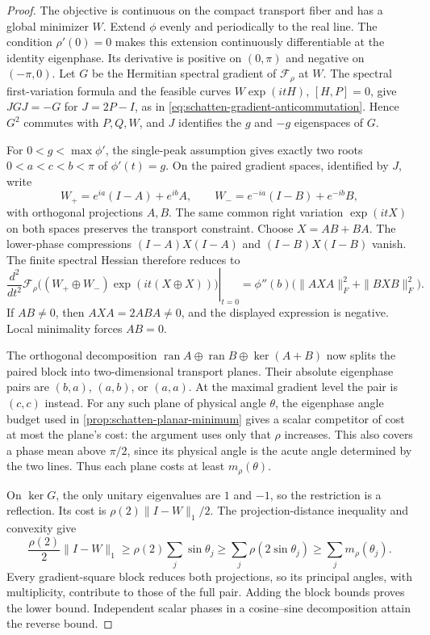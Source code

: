 \begin{proof}
The objective is continuous on the compact transport fiber and has a
global minimizer $W$. Extend $\phi$ evenly and periodically to the
real line. The condition $\rho'(0)=0$ makes this extension continuously
differentiable at the identity eigenphase. Its derivative is positive on
$(0,\pi)$ and negative on $(-\pi,0)$. Let $G$ be the Hermitian spectral
gradient of $\mathcal F_\rho$ at $W$. The spectral first-variation
formula and the feasible curves $W\exp(itH)$, $[H,P]=0$, give
$JGJ=-G$ for $J=2P-I$, as in
\cref{eq:schatten-gradient-anticommutation}. Hence $G^2$ commutes with
$P,Q,W$, and $J$ identifies the $g$ and $-g$ eigenspaces of $G$.

For $0<g<\max\phi'$, the single-peak assumption gives exactly two
roots $0<a<c<b<\pi$ of $\phi'(t)=g$. On the paired gradient spaces,
identified by $J$, write
\[
 W_+=e^{ia}(I-A)+e^{ib}A,\qquad
 W_-=e^{-ia}(I-B)+e^{-ib}B,
\]
with orthogonal projections $A,B$. The same common right variation
$\exp(itX)$ on both spaces preserves the transport constraint. Choose
$X=AB+BA$. The lower-phase compressions
$(I-A)X(I-A)$ and $(I-B)X(I-B)$ vanish. The finite spectral Hessian
therefore reduces to
\[
 \left.\frac{d^2}{dt^2}\mathcal F_\rho
      \bigl((W_+\oplus W_-)\exp(it(X\oplus X))\bigr)\right|_{t=0}
 =\phi''(b)\bigl(\|AXA\|_F^2+\|BXB\|_F^2\bigr).
\]
If $AB\ne0$, then $AXA=2ABA\ne0$, and the displayed expression is
negative. Local minimality forces $AB=0$.

The orthogonal decomposition
$\operatorname{ran}A\oplus\operatorname{ran}B\oplus\ker(A+B)$ now
splits the paired block into two-dimensional transport planes. Their
absolute eigenphase pairs are $(b,a)$, $(a,b)$, or $(a,a)$.
At the maximal gradient level the pair is $(c,c)$ instead.
For any such plane of physical angle $\theta$, the eigenphase angle
budget used in \cref{prop:schatten-planar-minimum} gives a scalar
competitor of cost at most the plane's cost: the argument uses only
that $\rho$ increases. This also covers a phase mean above $\pi/2$,
since its physical angle is the acute angle determined by the two lines.
Thus each plane costs at least $m_\rho(\theta)$.

On $\ker G$, the only unitary eigenvalues are $1$ and $-1$, so the
restriction is a reflection. Its cost is
$\rho(2)\|I-W\|_1/2$. The projection-distance inequality and convexity
give
\[
 \frac{\rho(2)}2\|I-W\|_1
 \geq \rho(2)\sum_j\sin\theta_j
 \geq \sum_j\rho(2\sin\theta_j)
 \geq \sum_j m_\rho(\theta_j).
\]
Every gradient-square block reduces both projections, so its principal
angles, with multiplicity, contribute to those of the full pair.
Adding the block bounds proves the lower bound. Independent scalar phases
in a cosine--sine decomposition attain the reverse bound.
\end{proof}

